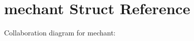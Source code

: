 \hypertarget{structmechant}{}\section{mechant Struct Reference}
\label{structmechant}


Collaboration diagram for mechant\+:
